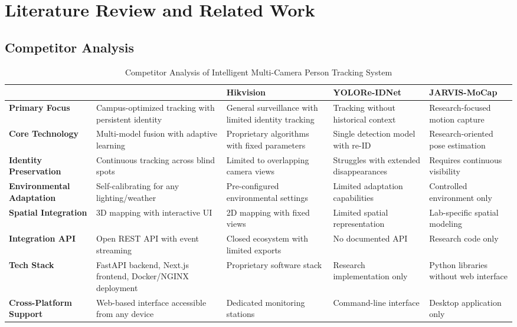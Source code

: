 \chapter{Literature Review and Related Work}
\label{chap:relatedworks}

\section{Competitor Analysis}
\label{section:competitor-analysis}

\begin{table}[htbp!]
    \begin{adjustwidth}{-.85in}{-.85in}
        \noindent
        \centering
        \small\begin{tabularx}{1.3\textwidth}{|X|>{\columncolor{green!20}}X|X|X|X|}
            \hline & \textbf{\usevar{\srsTitle}} & \textbf{Hikvision} & \textbf{YOLORe-IDNet} & \textbf{JARVIS-MoCap} \\\hline
            \textbf{Primary Focus} & Campus-optimized tracking with persistent identity & General surveillance with limited identity tracking & Tracking without historical context & Research-focused motion capture \\\hline
            \textbf{Core Technology} & Multi-model fusion with adaptive learning & Proprietary algorithms with fixed parameters & Single detection model with re-ID & Research-oriented pose estimation \\\hline
            \textbf{Identity Preservation} & Continuous tracking across blind spots & Limited to overlapping camera views & Struggles with extended disappearances & Requires continuous visibility \\\hline
            \textbf{Environmental Adaptation} & Self-calibrating for any lighting/weather & Pre-configured environmental settings & Limited adaptation capabilities & Controlled environment only \\\hline
            \textbf{Spatial Integration} & 3D mapping with interactive UI & 2D mapping with fixed views & Limited spatial representation & Lab-specific spatial modeling \\\hline
            \textbf{Integration API} & Open REST API with event streaming & Closed ecosystem with limited exports & No documented API & Research code only \\\hline
            \textbf{Tech Stack} & FastAPI backend, Next.js frontend, Docker/NGINX deployment & Proprietary software stack & Research implementation only & Python libraries without web interface \\\hline
            \textbf{Cross-Platform Support} & Web-based interface accessible from any device & Dedicated monitoring stations & Command-line interface & Desktop application only \\\hline
        \end{tabularx}
    \end{adjustwidth}
    \caption{Competitor Analysis of Intelligent Multi-Camera Person Tracking System}
\end{table}

